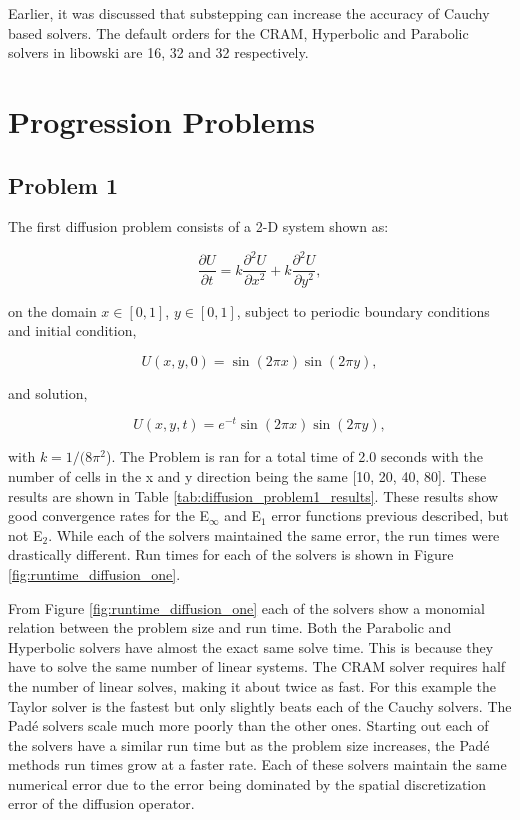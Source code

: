 Earlier, it was discussed that substepping can increase the accuracy of Cauchy based solvers. The default orders for the CRAM, Hyperbolic and Parabolic solvers in libowski are 16, 32 and 32 respectively. 

\section{Progression Problems}
\subsection{Problem 1}
The first diffusion problem consists of a 2-D system shown as:

\begin{equation}
    \frac{\partial U}{\partial t} = k\frac{\partial^{2}U}{\partial x^{2}} + k\frac{\partial^{2}U}{\partial y^{2}},
\end{equation}

\noindent on the domain $x \in [0,1]$, $y \in [0,1]$, subject to periodic boundary conditions and initial condition,


\begin{equation}
    U(x,y,0) = \sin(2\pi x)\sin(2\pi y),
\end{equation}

\noindent and solution,

\begin{equation}
    U(x,y,t) = e^{-t}\sin(2\pi x)\sin(2\pi y),
\end{equation}

\noindent with $k = 1/(8\pi^{2}$). The Problem is ran for a total time of 2.0 seconds with the number of cells in the x and y direction being the same [10, 20, 40, 80]. These results are shown in Table \ref{tab:diffusion_problem1_results}. These results show good convergence rates for the E${}_{\infty}$ and E${}_{1}$ error functions previous described, but not E${}_{2}$. While each of the solvers maintained the same error, the run times were drastically different. Run times for each of the solvers is shown in Figure \ref{fig:runtime_diffusion_one}.

From Figure \ref{fig:runtime_diffusion_one} each of the solvers show a monomial relation between the problem size and run time. Both the Parabolic and Hyperbolic solvers have almost the exact same solve time. This is because they have to solve the same number of linear systems. The CRAM solver requires half the number of linear solves, making it about twice as fast. For this example the Taylor solver is the fastest but only slightly beats each of the Cauchy solvers. The Pad\'e solvers scale much more poorly than the other ones. Starting out each of the solvers have a similar run time but as the problem size increases, the Pad\'e methods run times grow at a faster rate. Each of these solvers maintain the same numerical error due to the error being dominated by the spatial discretization error of the diffusion operator. 

